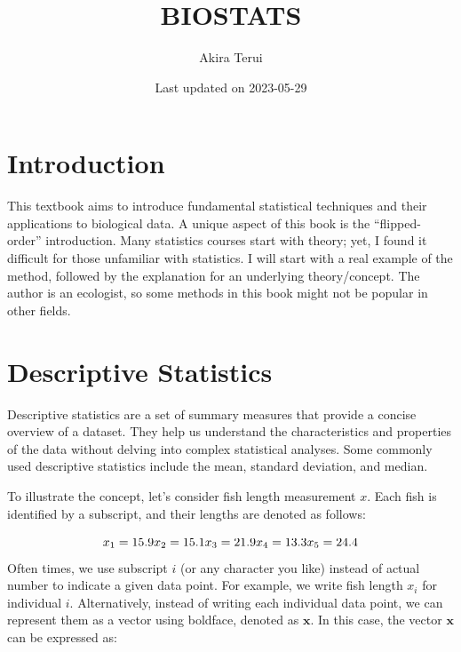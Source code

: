 \documentclass[
]{book}
\title{BIOSTATS}
\author{Akira Terui}
\date{Last updated on 2023-05-29}
\begin{document}
\maketitle

{
\setcounter{tocdepth}{1}
\tableofcontents
}
\hypertarget{introduction}{%
\chapter*{Introduction}\label{introduction}}

This textbook aims to introduce fundamental statistical techniques and their applications to biological data. A unique aspect of this book is the ``flipped-order'' introduction. Many statistics courses start with theory; yet, I found it difficult for those unfamiliar with statistics. I will start with a real example of the method, followed by the explanation for an underlying theory/concept. The author is an ecologist, so some methods in this book might not be popular in other fields.

\hypertarget{descriptive-statistics}{%
\chapter{Descriptive Statistics}\label{descriptive-statistics}}

Descriptive statistics are a set of summary measures that provide a concise overview of a dataset. They help us understand the characteristics and properties of the data without delving into complex statistical analyses. Some commonly used descriptive statistics include the mean, standard deviation, and median.

To illustrate the concept, let's consider fish length measurement \(x\). Each fish is identified by a subscript, and their lengths are denoted as follows:

\[
x_1 = 15.9\\
x_2 = 15.1\\
x_3 = 21.9\\
x_4 = 13.3\\
x_5 = 24.4\\
\]Often times, we use subscript \(i\) (or any character you like) instead of actual number to indicate a given data point. For example, we write fish length \(x_i\) for individual \(i\). Alternatively, instead of writing each individual data point, we can represent them as a vector using boldface, denoted as \(\pmb{x}\). In this case, the vector \(\pmb{x}\) can be expressed as:
\end{document}
